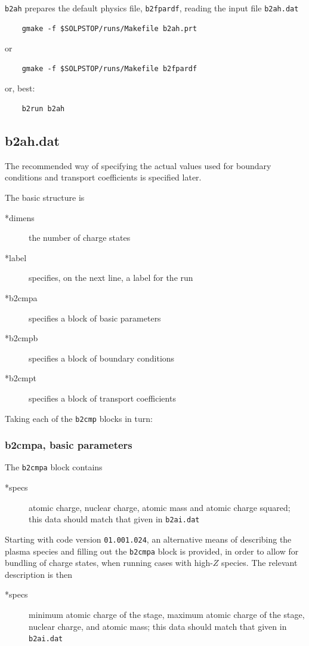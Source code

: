 \documentclass[a4paper,10pt]{report}
\begin{document}
{\tt b2ah} prepares the default physics file, {\tt b2fpardf},
reading the input file {\tt b2ah.dat}

\begin{verbatim}
    gmake -f $SOLPSTOP/runs/Makefile b2ah.prt
\end{verbatim}
or
\begin{verbatim}
    gmake -f $SOLPSTOP/runs/Makefile b2fpardf
\end{verbatim}
or, best:
\begin{verbatim}
    b2run b2ah
\end{verbatim}

\subsection{b2ah.dat}

The recommended way of specifying the actual values used for boundary
conditions and transport coefficients is specified later.


The basic structure is
\begin{description}
\item[*dimens] the number of charge states
\item[*label] specifies, on the next line, a label for the run
\item[*b2cmpa] specifies a block of basic parameters
\item[*b2cmpb] specifies a block of boundary conditions
\item[*b2cmpt] specifies a block of transport coefficients
\end{description}

Taking each of the {\tt b2cmp} blocks in turn:

\subsubsection{b2cmpa, basic parameters}

The {\tt b2cmpa} block contains
\begin{description}
\item[*specs] atomic charge, nuclear charge, atomic mass and atomic
  charge squared; this data should match that given in {\tt b2ai.dat}
\end{description}

Starting with code version {\tt 01.001.024}, an alternative means of
describing the plasma species and filling out the {\tt b2cmpa} block
is provided, in order to allow for bundling of charge states, when
running cases with high-$Z$ species. The relevant description is then
\begin{description}
\item[*specs] minimum atomic charge of the stage, maximum atomic charge
  of the stage, nuclear charge, and atomic mass; this data should match
  that given in {\tt b2ai.dat}
\end{description}
\end{document}

